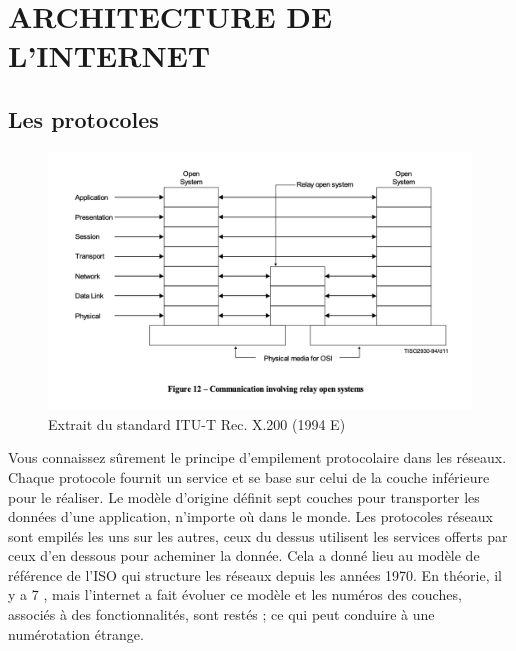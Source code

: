 
\acresetall
\chapter{ARCHITECTURE DE L'INTERNET}

\section{Les protocoles}
  
    \vspace{1em}

  \begin{figure}
\centerline{\includegraphics[width=.6\columnwidth]{Pictures/OSI.png}}
\caption{Extrait du standard ITU-T Rec. X.200 (1994 E)}
\end{figure}

Vous connaissez sûrement le principe d'empilement protocolaire dans les réseaux. Chaque protocole fournit un service et se base sur celui de la couche inférieure pour le réaliser. Le modèle d'origine définit sept couches pour transporter les données d'une application, n'importe où dans le monde.
  Les protocoles réseaux sont empilés les uns sur les autres, ceux du dessus utilisent les services offerts par ceux d’en dessous pour acheminer la donnée. Cela a donné lieu au modèle de référence de l’\ac{ISO} qui structure les réseaux depuis les années 1970. En théorie, il y a 7 , mais l'internet a fait évoluer ce modèle et les numéros des couches, associés à des fonctionnalités, sont restés ; ce qui peut conduire à une numérotation étrange.
  
